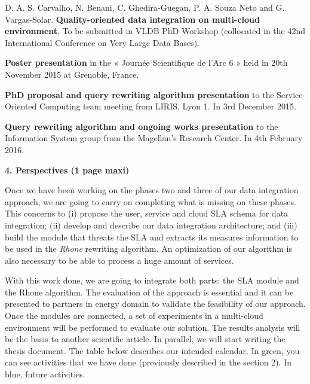 \documentclass[11pt,a4paper,oneside]{report}
\begin{document}
\noindent
D. A. S. Carvalho, N. Benani, C. Ghedira-Guegan, P. A. Souza Neto and G. Vargas-Solar. \textbf{Quality-oriented data integration on multi-cloud environment}. To be submitted in VLDB PhD Workshop (collocated in the 42nd International Conference on Very Large Data Bases).
\bigskip

\noindent
\textbf{Poster presentation} in the « Journée Scientifique de l'Arc 6 » held in 20th November 2015 at Grenoble, France. 
\bigskip

\noindent
\textbf{PhD proposal and query rewriting algorithm presentation} to the Service-Oriented Computing team meeting from LIRIS, Lyon 1. In 3rd December 2015.
\bigskip

\noindent
\textbf{Query rewriting algorithm and ongoing works presentation} to the Information System group from the Magellan’s Research Center. In 4th February 2016.

\newpage
\begin{flushleft}
\textbf{4. Perspectives (1 page maxi)}\\
\end{flushleft}

Once we have been working on the phases two and three of our data integration approach, we are going to carry on completing what is missing on these phases. This concerns to (i) propose the user, service and cloud SLA schema for data integration; (ii) develop and describe our data integration architecture; and (iii) build the module that threats the SLA  and extracts its measures information to be used in the \textit{Rhone} rewriting algorithm. An optimization of our algorithm is also necessary to be able to process a huge amount of services.

With this work done, we are going to integrate both parts: the SLA module and the Rhone algorithm. The evaluation of the approach is essential and it can be presented to partners in energy domain to validate the feasibility of our approach. Once the modules are connected, a set of experiments in a multi-cloud environment will be performed to evaluate our solution. The results analysis will be the basis to another scientific article. In parallel, we will start writing the thesis document. The table below describes our intended calendar. In green, you can see activities that we have done (previously described in the section 2). In blue, future activities.
\end{document}
